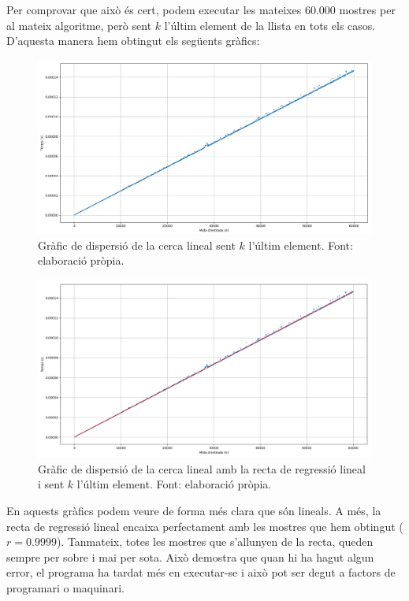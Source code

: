 Per comprovar que això és cert, podem executar les mateixes 60.000 mostres per al mateix algoritme, però sent $k$ l'últim element de la llista en tots els casos. D'aquesta manera hem obtingut els següents gràfics:
\begin{figure}[H]
    \centering
    \includegraphics[width=1\textwidth]{capitols/figures/3.png}
    \caption[Gràfic de dispersió de la cerca lineal sent $k$ l'últim element.]{Gràfic de dispersió de la cerca lineal sent $k$ l'últim element. Font: elaboració pròpia.}
    \label{fig:my_label}
\end{figure}
\begin{figure}[H]
    \centering
    \includegraphics[width=1\textwidth]{capitols/figures/4.png}
    \caption[Gràfic de dispersió de la cerca lineal amb la recta de regressió lineal i sent $k$ l'últim element.]{Gràfic de dispersió de la cerca lineal amb la recta de regressió lineal i sent $k$ l'últim element. Font: elaboració pròpia.}
    \label{fig:my_label}
\end{figure}

En aquests gràfics podem veure de forma més clara que són lineals. A més, la recta de regressió lineal encaixa perfectament amb les mostres que hem obtingut ($r = 0.9999$). Tanmateix, totes les mostres que s'allunyen de la recta, queden sempre per sobre i mai per sota. Això demostra que quan hi ha hagut algun error, el programa ha tardat més en executar-se i això pot ser degut a factors de programari o maquinari.

